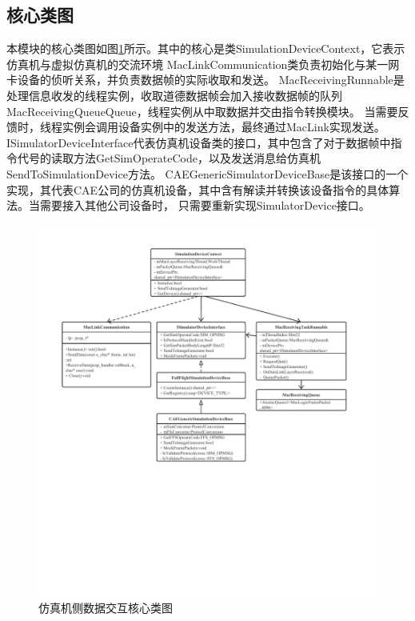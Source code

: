 \subsection{核心类图}
\par
本模块的核心类图如图\ref{module12}所示。其中的核心是类SimulationDeviceContext，它表示仿真机与虚拟仿真机的交流环境
MacLinkCommunication类负责初始化与某一网卡设备的侦听关系，并负责数据帧的实际收取和发送。
MacReceivingRunnable是处理信息收发的线程实例，收取道德数据帧会加入接收数据帧的队列MacReceivingQueueQueue，线程实例从中取数据并交由指令转换模块。
当需要反馈时，线程实例会调用设备实例中的发送方法，最终通过MacLink实现发送。
ISimulatorDeviceInterface代表仿真机设备类的接口，其中包含了对于数据帧中指令代号的读取方法GetSimOperateCode，以及发送消息给仿真机SendToSimulationDevice方法。
CAEGenericSimulatorDeviceBase是该接口的一个实现，其代表CAE公司的仿真机设备，其中含有解读并转换该设备指令的具体算法。当需要接入其他公司设备时，
只需要重新实现SimulatorDevice接口。

\begin{figure}[h!]
    \begin{center}
        \includegraphics[width=\textwidth]{pictures/classdiagram1.pdf}
        \caption{仿真机侧数据交互核心类图}
        \label{module12}
    \end{center}
\end{figure}
